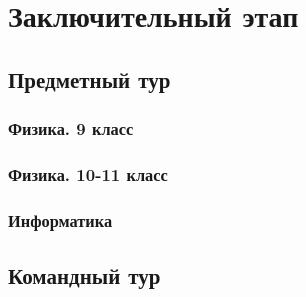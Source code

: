 \documentclass[a4paper,12pt,oneside]{book}
\begin{document}
\part{Заключительный этап}

\clearpage
\chapter{Предметный тур}

\section{Физика. 9 класс}


\section{Физика. 10-11 класс}


\section{Информатика}


\chapter{Командный тур}


\end{document}
